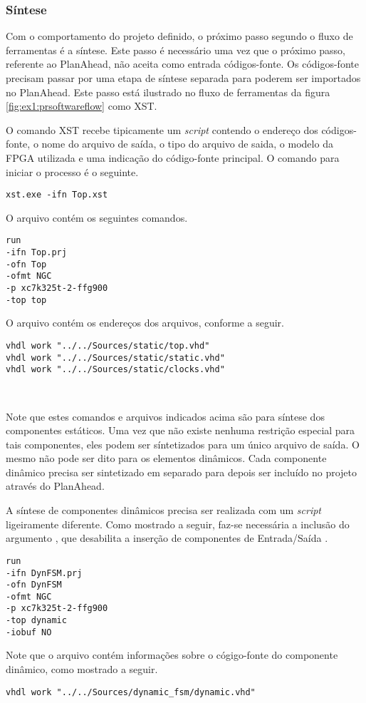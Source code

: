 \documentclass[11pt,a4paper,oneside]{book}
\begin{document}
\subsubsection{Síntese}
Com o comportamento do projeto definido, o próximo passo segundo o fluxo de ferramentas é a síntese.
Este passo é necessário uma vez que o próximo passo, referente ao PlanAhead, não aceita como entrada códigos-fonte.
Os códigos-fonte precisam passar por uma etapa de síntese separada para poderem ser importados no PlanAhead.
Este passo está ilustrado no fluxo de ferramentas da figura \ref{fig:ex1:prsoftwareflow} como XST.

O comando XST recebe tipicamente um \textit{script} contendo o endereço dos códigos-fonte, o nome do arquivo de saída, o tipo do arquivo de saida, o modelo da FPGA utilizada e uma indicação do código-fonte principal.
O comando para iniciar o processo é o seguinte.
\begin{lstlisting}[style=customVHDL]
xst.exe -ifn Top.xst
\end{lstlisting}
O arquivo  contém os seguintes comandos.
\begin{lstlisting}[style=customVHDL]
run
-ifn Top.prj
-ofn Top
-ofmt NGC
-p xc7k325t-2-ffg900
-top top
\end{lstlisting}
O arquivo  contém os endereços dos arquivos, conforme a seguir.
\begin{lstlisting}[style=customVHDL]
vhdl work "../../Sources/static/top.vhd"
vhdl work "../../Sources/static/static.vhd"
vhdl work "../../Sources/static/clocks.vhd"
\end{lstlisting}\

Note que estes comandos e arquivos indicados acima são para síntese dos componentes estáticos.
Uma vez que não existe nenhuma restrição especial para tais componentes, eles podem ser síntetizados para um único arquivo de saída.
O mesmo não pode ser dito para os elementos dinâmicos.
Cada componente dinâmico precisa ser sintetizado em separado para depois ser incluído no projeto através do PlanAhead.

A síntese de componentes dinâmicos precisa ser realizada com um \textit{script}  ligeiramente diferente.
Como mostrado a seguir, faz-se necessária a inclusão do argumento , que desabilita a inserção de componentes de Entrada/Saída \cite{ug743, ug748}.
\begin{lstlisting}[style=customVHDL]
run
-ifn DynFSM.prj
-ofn DynFSM
-ofmt NGC
-p xc7k325t-2-ffg900
-top dynamic
-iobuf NO
\end{lstlisting}
Note que o arquivo  contém informações sobre o cógigo-fonte do componente dinâmico, como mostrado a seguir.
\begin{lstlisting}[style=customVHDL]
vhdl work "../../Sources/dynamic_fsm/dynamic.vhd"
\end{lstlisting}
\end{document}
